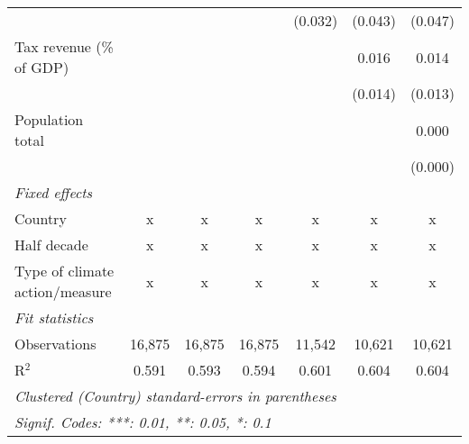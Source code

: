 \begin{tabular}{lcccccc}
                                                           &         &                &                & (0.032)        & (0.043)        & (0.047)\\   
   Tax revenue (\% of GDP)                                 &         &                &                &                & 0.016          & 0.014\\   
                                                           &         &                &                &                & (0.014)        & (0.013)\\   
   Population total                                        &         &                &                &                &                & 0.000\\   
                                                           &         &                &                &                &                & (0.000)\\   
   \emph{Fixed effects}\\
   Country                                                 & x       & x              & x              & x              & x              & x\\  
   Half decade                                             & x       & x              & x              & x              & x              & x\\  
   Type of climate action/measure                          & x       & x              & x              & x              & x              & x\\  
   \midrule \emph{Fit statistics}\\
   Observations                                            & 16,875  & 16,875         & 16,875         & 11,542         & 10,621         & 10,621\\  
   R$^2$                                                   & 0.591   & 0.593          & 0.594          & 0.601          & 0.604          & 0.604\\  
   \midrule
   \multicolumn{7}{l}{\emph{Clustered (Country) standard-errors in parentheses}}\\
   \multicolumn{7}{l}{\emph{Signif. Codes: ***: 0.01, **: 0.05, *: 0.1}}\\
\end{tabular}
\par\endgroup


